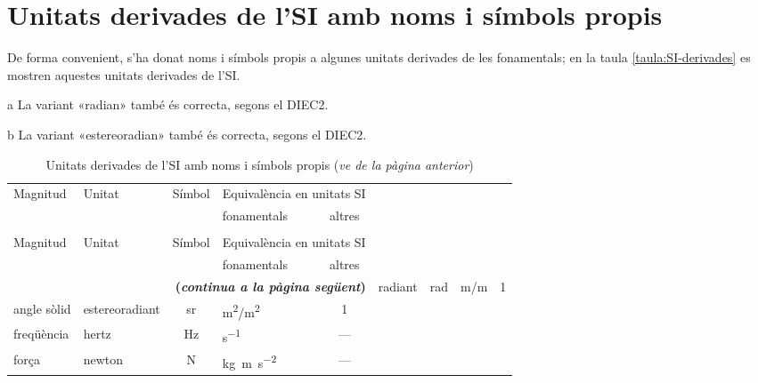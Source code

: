 \section{Unitats derivades de l'SI amb noms i símbols propis}
\label{sec:unitata-derv-SI}

De forma convenient, s'ha donat noms i símbols propis a algunes unitats derivades de les fonamentals; en la taula \vref{taula:SI-derivades} es mostren aquestes unitats derivades de l'SI.

\begin{ThreePartTable}
\begin{TableNotes}
    \item[a] {\footnotesize La variant «radian» també és correcta, segons el DIEC2.}
    \item[b] {\footnotesize La variant «estereoradian» també és correcta, segons el DIEC2.}
\end{TableNotes}
\begin{longtable}[h]{llclc}
   \caption{\label{taula:SI-derivades} Unitats derivades de
   l'SI amb noms i símbols propis}\\
   \toprule[1pt]
    \multirow{2}{15mm}{\rule{0mm}{6mm}Magnitud} & \multirow{2}{15mm}{\rule{0mm}{6mm}Unitat}  &
    \multirow{2}{15mm}{\rule{0mm}{6mm}Símbol}  & \multicolumn{2}{c}{Equivalència en unitats SI}\\
    \cmidrule(rl){4-5}
    &  &   & fonamentals & altres\\
   \midrule
   \endfirsthead
   \caption[]{Unitats derivades de l'SI amb noms i símbols propis (\emph{ve de la pàgina
   anterior})}\\
   \toprule[1pt]
    \multirow{2}{15mm}{\rule{0mm}{6mm}Magnitud} & \multirow{2}{15mm}{\rule{0mm}{6mm}Unitat}  &
    \multirow{2}{15mm}{\rule{0mm}{6mm}Símbol}  & \multicolumn{2}{c}{Equivalència en unitats SI}\\
    \cmidrule(rl){4-5}
    &  &  & fonamentals & altres\\
   \midrule
   \endhead
   \midrule
   \multicolumn{5}{r}{\sffamily\bfseries\color{NavyBlue}(\emph{continua a la pàgina següent})}
   \endfoot
   \insertTableNotes
   \endlastfoot
   angle pla & radiant\tnote{a} & rad   & \unit{m/m} & 1\\
   angle sòlid & estereoradiant\tnote{b} & sr & \unit{m^2/m^2}  & 1 \\
   freqüència & hertz & Hz & \unit{s^{-1}} & --- \\
   força & newton & N & \unit{kg.m.s^{-2}} & --- \\

\end{longtable}
\end{ThreePartTable}
